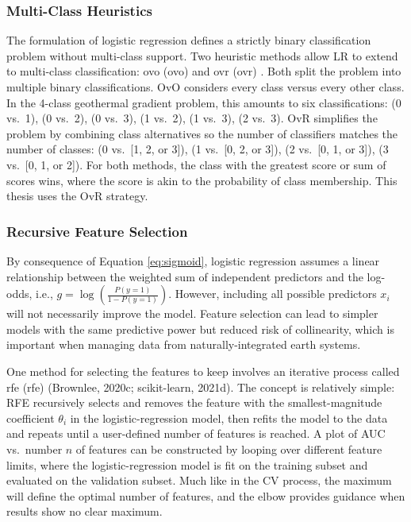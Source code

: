 \subsubsection{Multi-Class Heuristics} \label{ch3:lr_multiclass}

The formulation of logistic regression defines a strictly binary classification problem without multi-class support. Two heuristic methods allow LR to extend to multi-class classification: \acrlong{ovo} (\acrshort{ovo}) and \acrlong{ovr} (\acrshort{ovr}) \citep{brownlee_one-vs-rest_2020,scikit-learn_multiclass_2021}. Both split the problem into multiple binary classifications. OvO considers every class versus every other class. In the 4-class geothermal gradient problem, this amounts to six classifications: (0 vs.\ 1), (0 vs.\ 2), (0 vs.\ 3), (1 vs.\ 2), (1 vs.\ 3), (2 vs.\ 3). OvR simplifies the problem by combining class alternatives so the number of classifiers matches the number of classes: (0 vs.\ [1, 2, or 3]), (1 vs.\ [0, 2, or 3]), (2 vs.\ [0, 1, or 3]), (3 vs.\ [0, 1, or 2]). For both methods, the class with the greatest score or sum of scores wins, where the score is akin to the probability of class membership. This thesis uses the OvR strategy.

\subsubsection{Recursive Feature Selection} \label{ch3:lr_rfe}

By consequence of Equation \ref{eq:sigmoid}, logistic regression assumes a linear relationship between the weighted sum of independent predictors and the log-odds, i.e., $g=\log(\frac{P(y=1)}{1-P(y=1)})$. However, including all possible predictors $x_i$ will not necessarily improve the model. Feature selection can lead to simpler models with the same predictive power but reduced risk of collinearity, which is important when managing data from naturally-integrated earth systems.

One method for selecting the features to keep involves an iterative process called \acrlong{rfe} (\acrshort{rfe}) (Brownlee, 2020c; scikit-learn, 2021d). The concept is relatively simple: RFE recursively selects and removes the feature with the smallest-magnitude coefficient $\theta_i$ in the logistic-regression model, then refits the model to the data and repeats until a user-defined number of features is reached.  A plot of AUC vs.\ number $n$ of features can be constructed by looping over different feature limits, where the logistic-regression model is fit on the training subset and evaluated on the validation subset. Much like in the CV process, the maximum will define the optimal number of features, and the elbow provides guidance when results show no clear maximum.

